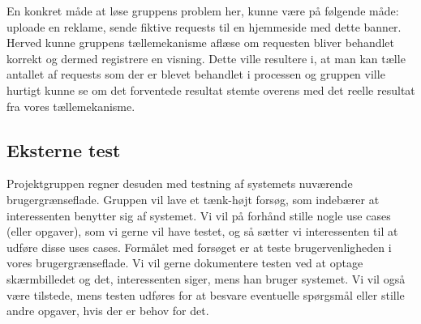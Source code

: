 \documentclass[a4paper,12pt]{article}
\begin{document}
En konkret måde at løse gruppens problem her, kunne være på følgende måde: uploade en reklame, sende fiktive requests til en hjemmeside med dette banner. Herved kunne gruppens tællemekanisme aflæse om requesten bliver behandlet korrekt og dermed registrere en visning. Dette ville resultere i, at man kan tælle antallet af requests som der er blevet behandlet i processen og gruppen ville hurtigt kunne se om det forventede resultat stemte overens med det reelle resultat fra vores tællemekanisme.

\subsection{Eksterne test}
Projektgruppen regner desuden med testning af systemets nuværende brugergrænseflade. Gruppen vil lave et tænk-højt forsøg, som indebærer at interessenten benytter sig af systemet. Vi vil på forhånd stille nogle use cases (eller opgaver), som vi gerne vil have testet, og så sætter vi interessenten til at udføre disse uses cases. Formålet med forsøget er at teste brugervenligheden i vores brugergrænseflade. Vi vil gerne dokumentere testen ved at optage skærmbilledet og det, interessenten siger, mens han bruger systemet. Vi vil også være tilstede, mens testen udføres for at besvare eventuelle spørgsmål eller stille andre opgaver, hvis der er behov for det.
\end{document}
